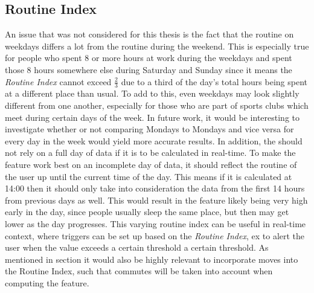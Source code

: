 \subsection{Routine Index}
An issue that was not considered for this thesis is the fact that the routine on weekdays differs a lot from the routine during the weekend. This is especially true for people who spent 8 or more hours at work during the weekdays and spent those 8 hours somewhere else during Saturday and Sunday since it means the \textit{Routine Index} cannot exceed $\frac{2}{3}$ due to a third of the day's total hours being spent at a different place than usual. To add to this, even weekdays may look slightly different from one another, especially for those who are part of sports clubs which meet during certain days of the week. In future work, it would be interesting to investigate whether or not comparing Mondays to Mondays and vice versa for every day in the week would yield more accurate results. In addition, the  should not rely on a full day of data if it is to be calculated in real-time. To make the feature work best on an incomplete day of data, it should reflect the routine of the user up until the current time of the day. This means if it is calculated at 14:00 then it should only take into consideration the data from the first 14 hours from previous days as well. This would result in the feature likely being very high early in the day, since people usually sleep the same place, but then may get lower as the day progresses. This varying routine index can be useful in real-time context, where triggers can be set up based on the \textit{Routine Index}, ex to alert the user when the value exceeds a certain threshold a certain threshold. As mentioned in section \label{sub:routine-index} it would also be highly relevant to incorporate moves into the Routine Index, such that commutes will be taken into account when computing the feature.

